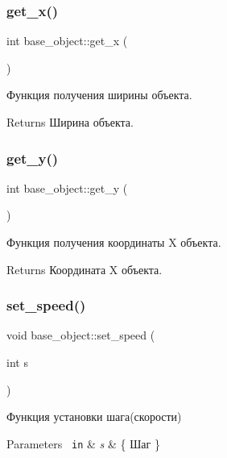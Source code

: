 \subsubsection{\texorpdfstring{get\_x()}{get\_x()}}
{\footnotesize\ttfamily int base\+\_\+object\+::get\+\_\+x (\begin{DoxyParamCaption}{ }\end{DoxyParamCaption})}



Функция получения ширины объекта. 

\begin{DoxyReturn}{Returns}
Ширина объекта. 
\end{DoxyReturn}
\mbox{\label{classbase__object_ad1ff677f0809e24496f87c27ea2c65ec}} 
\subsubsection{\texorpdfstring{get\_y()}{get\_y()}}
{\footnotesize\ttfamily int base\+\_\+object\+::get\+\_\+y (\begin{DoxyParamCaption}{ }\end{DoxyParamCaption})}



Функция получения координаты X объекта. 

\begin{DoxyReturn}{Returns}
Координата X объекта. 
\end{DoxyReturn}
\mbox{\label{classbase__object_a6aa28faa9734744b5992da58121e6095}} 
\subsubsection{\texorpdfstring{set\_speed()}{set\_speed()}}
{\footnotesize\ttfamily void base\+\_\+object\+::set\+\_\+speed (\begin{DoxyParamCaption}\item[{int}]{s }\end{DoxyParamCaption})}



Функция установки шага(скорости) 


\begin{DoxyParams}[1]{Parameters}
\mbox{\texttt{ in}}  & {\em s} & \{ Шаг \} \\
\hline
\end{DoxyParams}


